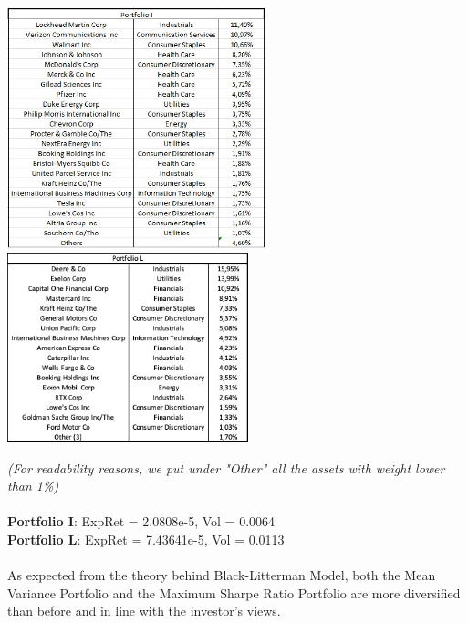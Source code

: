 \documentclass{assignment}
\begin{document}
\begin{center}
    \includegraphics[height=7cm]
    {assets/Port_I.jpg}
    \quad
    \includegraphics[height=5.5cm]
    {assets/Port_L.jpg} 
\end{center}
\textit{(For readability reasons, we put under "Other" all the assets with weight lower than 1\%)}
\\\\
\textbf{Portfolio I}: ExpRet = 2.0808e-5, Vol = 0.0064\\
\textbf{Portfolio L}: ExpRet = 7.43641e-5, Vol = 0.0113\\\\
As expected from the theory behind Black-Litterman Model, both the Mean Variance Portfolio and the
Maximum Sharpe Ratio Portfolio are more diversified than before and in line with the investor's
views. 
\end{document}
